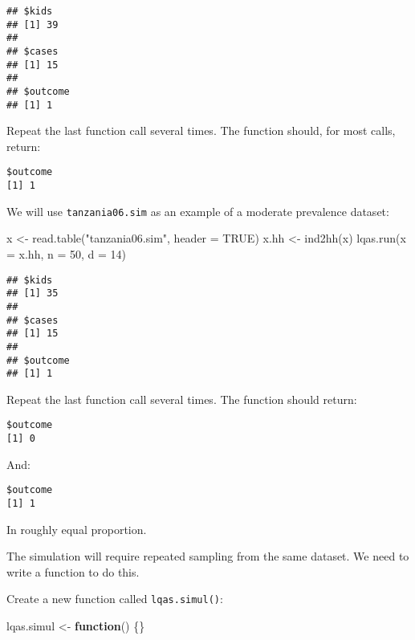 \documentclass[
  12pt,
  a4paper]{book}
\newenvironment{Shaded}{\begin{snugshade}}{\end{snugshade}}
\newcommand{\AttributeTok}[1]{\textcolor[rgb]{0.77,0.63,0.00}{#1}}
\newcommand{\ConstantTok}[1]{\textcolor[rgb]{0.00,0.00,0.00}{#1}}
\newcommand{\ControlFlowTok}[1]{\textcolor[rgb]{0.13,0.29,0.53}{\textbf{#1}}}
\newcommand{\DecValTok}[1]{\textcolor[rgb]{0.00,0.00,0.81}{#1}}
\newcommand{\FunctionTok}[1]{\textcolor[rgb]{0.00,0.00,0.00}{#1}}
\newcommand{\NormalTok}[1]{#1}
\newcommand{\OtherTok}[1]{\textcolor[rgb]{0.56,0.35,0.01}{#1}}
\newcommand{\StringTok}[1]{\textcolor[rgb]{0.31,0.60,0.02}{#1}}
\begin{document}
\begin{verbatim}
## $kids
## [1] 39
## 
## $cases
## [1] 15
## 
## $outcome
## [1] 1
\end{verbatim}

Repeat the last function call several times. The function should, for most calls, return:

\begin{verbatim}
$outcome
[1] 1
\end{verbatim}

We will use \texttt{tanzania06.sim} as an example of a moderate prevalence dataset:

\begin{Shaded}
\begin{Highlighting}[]
\NormalTok{x }\OtherTok{\textless{}{-}} \FunctionTok{read.table}\NormalTok{(}\StringTok{"tanzania06.sim"}\NormalTok{, }\AttributeTok{header =} \ConstantTok{TRUE}\NormalTok{)}
\NormalTok{x.hh }\OtherTok{\textless{}{-}} \FunctionTok{ind2hh}\NormalTok{(x)}
\FunctionTok{lqas.run}\NormalTok{(}\AttributeTok{x =}\NormalTok{ x.hh, }\AttributeTok{n =} \DecValTok{50}\NormalTok{, }\AttributeTok{d =} \DecValTok{14}\NormalTok{)}
\end{Highlighting}
\end{Shaded}

\begin{verbatim}
## $kids
## [1] 35
## 
## $cases
## [1] 15
## 
## $outcome
## [1] 1
\end{verbatim}

Repeat the last function call several times. The function should return:

\begin{verbatim}
$outcome
[1] 0
\end{verbatim}

And:

\begin{verbatim}
$outcome
[1] 1
\end{verbatim}

In roughly equal proportion.

The simulation will require repeated sampling from the same dataset. We need to write a function to do this.

Create a new function called \texttt{lqas.simul()}:

\begin{Shaded}
\begin{Highlighting}[]
\NormalTok{lqas.simul }\OtherTok{\textless{}{-}} \ControlFlowTok{function}\NormalTok{() \{\}}
\end{Highlighting}
\end{Shaded}
\end{document}
